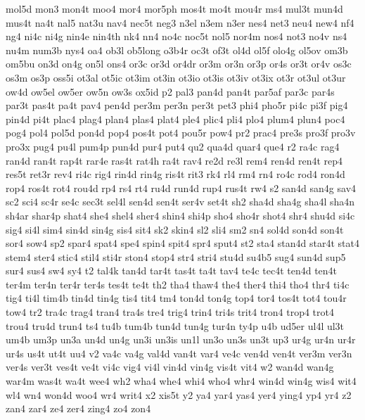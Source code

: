 mol5d
mon3
mon4t
moo4
mor4
mor5ph
mos4t
mo4t
mou4r
ms4
mul3t
mun4d
mus4t
na4t
nal5
nat3u
nav4
nec5t
neg3
n3el
n3em
n3er
nes4
net3
neu4
new4
nf4
ng4
ni4c
ni4g
nin4e
nin4th
nk4
nn4
no4c
noc5t
nol5
nor4m
nos4
not3
no4v
ns4
nu4m
num3b
nys4
oa4
ob3l
ob5long
o3b4r
oc3t
of3t
ol4d
ol5f
olo4g
ol5ov
om3b
om5bu
on3d
on4g
on5l
ons4
or3c
or3d
or4dr
or3m
or3n
or3p
or4s
or3t
or4v
os3c
os3m
os3p
oss5i
ot3al
ot5ic
ot3im
ot3in
ot3io
ot3is
ot3iv
ot3ix
ot3r
ot3ul
ot3ur
ow4d
ow5el
ow5er
ow5n
ow3s
ox5id
p2
pal3
pan4d
pan4t
par5af
par3c
par4s
par3t
pas4t
pa4t
pav4
pen4d
per3m
per3n
per3t
pet3
phi4
pho5r
pi4c
pi3f
pig4
pin4d
pi4t
plac4
plag4
plan4
plas4
plat4
ple4
plic4
pli4
plo4
plum4
plun4
poc4
pog4
pol4
pol5d
pon4d
pop4
pos4t
pot4
pou5r
pow4
pr2
prac4
pre3s
pro3f
pro3v
pro3x
pug4
pu4l
pum4p
pun4d
pur4
put4
qu2
qua4d
quar4
que4
r2
ra4c
rag4
ran4d
ran4t
rap4t
rar4e
ras4t
rat4h
ra4t
rav4
re2d
re3l
rem4
ren4d
ren4t
rep4
res5t
ret3r
rev4
ri4c
rig4
rin4d
rin4g
ris4t
rit3
rk4
rl4
rm4
rn4
ro4c
rod4
ron4d
rop4
ros4t
rot4
rou4d
rp4
rs4
rt4
ru4d
run4d
rup4
rus4t
rw4
s2
san4d
san4g
sav4
sc2
sci4
sc4r
se4c
sec3t
sel4l
sen4d
sen4t
ser4v
set4t
sh2
sha4d
sha4g
sha4l
sha4n
sh4ar
shar4p
shat4
she4
shel4
sher4
shin4
shi4p
sho4
sho4r
shot4
shr4
shu4d
si4c
sig4
si4l
sim4
sin4d
sin4g
sis4
sit4
sk2
skin4
sl2
sli4
sm2
sn4
sol4d
son4d
son4t
sor4
sow4
sp2
spar4
spat4
spe4
spin4
spit4
spr4
sput4
st2
sta4
stan4d
star4t
stat4
stem4
ster4
stic4
stil4
sti4r
ston4
stop4
str4
stri4
stu4d
su4b5
sug4
sun4d
sup5
sur4
sus4
sw4
sy4
t2
tal4k
tan4d
tar4t
tas4t
ta4t
tav4
te4c
tec4t
ten4d
ten4t
ter4m
ter4n
ter4r
ter4s
tes4t
te4t
th2
tha4
thaw4
the4
ther4
thi4
tho4
thr4
ti4c
tig4
ti4l
tim4b
tin4d
tin4g
tis4
tit4
tm4
ton4d
ton4g
top4
tor4
tos4t
tot4
tou4r
tow4
tr2
tra4c
trag4
tran4
tra4s
tre4
trig4
trin4
tri4s
trit4
tron4
trop4
trot4
trou4
tru4d
trun4
ts4
tu4b
tum4b
tun4d
tun4g
tur4n
ty4p
u4b
ud5er
ul4l
ul3t
um4b
um3p
un3a
un4d
un4g
un3i
un3is
un1l
un3o
un3s
un3t
up3
ur4g
ur4n
ur4r
ur4s
us4t
ut4t
uu4
v2
va4c
va4g
val4d
van4t
var4
ve4c
ven4d
ven4t
ver3m
ver3n
ver4s
ver3t
ves4t
ve4t
vi4c
vig4
vi4l
vin4d
vin4g
vis4t
vit4
w2
wan4d
wan4g
war4m
was4t
wa4t
wee4
wh2
wha4
whe4
whi4
who4
whr4
win4d
win4g
wis4
wit4
wl4
wn4
won4d
woo4
wr4
writ4
x2
xis5t
y2
ya4
yar4
yas4
yer4
ying4
yp4
yr4
z2
zan4
zar4
ze4
zer4
zing4
zo4
zon4
